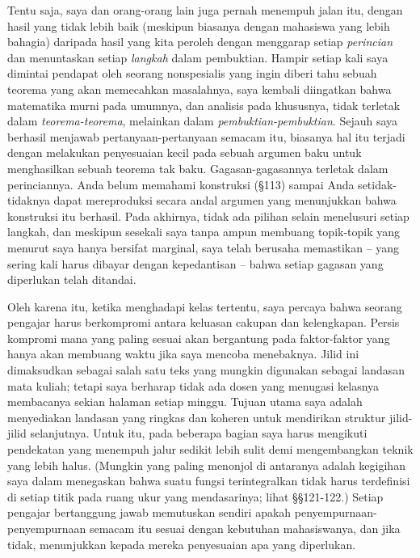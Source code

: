 Tentu saja, saya dan orang-orang lain juga pernah menempuh jalan itu,
dengan hasil yang tidak lebih baik (meskipun biasanya dengan mahasiswa
yang lebih bahagia) daripada hasil yang kita peroleh dengan menggarap setiap
{\it perincian} dan menuntaskan setiap {\it langkah} dalam pembuktian. Hampir
setiap kali saya dimintai pendapat oleh seorang
nonspesialis yang ingin diberi tahu sebuah teorema yang akan memecahkan
masalahnya, saya kembali diingatkan bahwa matematika murni pada umumnya,
dan analisis pada khususnya, tidak terletak dalam {\it teorema-teorema},
melainkan dalam {\it pembuktian-pembuktian}. Sejauh saya berhasil
menjawab pertanyaan-pertanyaan semacam itu, biasanya hal itu terjadi
dengan melakukan penyesuaian kecil pada sebuah argumen baku untuk
menghasilkan sebuah teorema tak baku.
Gagasan-gagasannya terletak dalam perinciannya. Anda belum memahami
konstruksi \Caratheodory{} (\S113) sampai Anda setidak-tidaknya dapat
mereproduksi secara andal argumen yang menunjukkan bahwa konstruksi itu
berhasil. Pada akhirnya, tidak ada pilihan selain menelusuri setiap
langkah, dan meskipun sesekali saya tanpa ampun membuang topik-topik yang
menurut saya hanya bersifat marginal, saya telah berusaha memastikan --
yang sering kali harus dibayar dengan kepedantisan -- bahwa setiap
gagasan yang diperlukan telah ditandai.

Oleh karena itu, ketika menghadapi kelas tertentu, saya percaya bahwa
seorang pengajar harus berkompromi antara keluasan cakupan dan
kelengkapan. Persis kompromi mana yang paling sesuai akan bergantung pada
faktor-faktor yang hanya akan membuang waktu jika saya mencoba
menebaknya. Jilid ini dimaksudkan sebagai salah satu teks yang mungkin
digunakan sebagai landasan mata kuliah; tetapi saya berharap tidak ada
dosen yang menugasi kelasnya membacanya sekian halaman setiap minggu.
Tujuan utama saya adalah menyediakan landasan yang ringkas dan koheren
untuk mendirikan struktur jilid-jilid selanjutnya. Untuk itu, pada beberapa
bagian saya harus mengikuti pendekatan yang menempuh jalur
sedikit lebih sulit demi mengembangkan teknik yang lebih halus. (Mungkin
yang paling menonjol di antaranya adalah kegigihan saya dalam menegaskan bahwa
suatu fungsi terintegralkan tidak harus terdefinisi di setiap titik pada
ruang ukur yang mendasarinya; lihat \S\S121-122.)
Setiap pengajar bertanggung jawab memutuskan sendiri apakah
penyempurnaan-penyempurnaan semacam itu sesuai dengan kebutuhan
mahasiswanya, dan jika tidak, menunjukkan kepada mereka penyesuaian apa
yang diperlukan.

